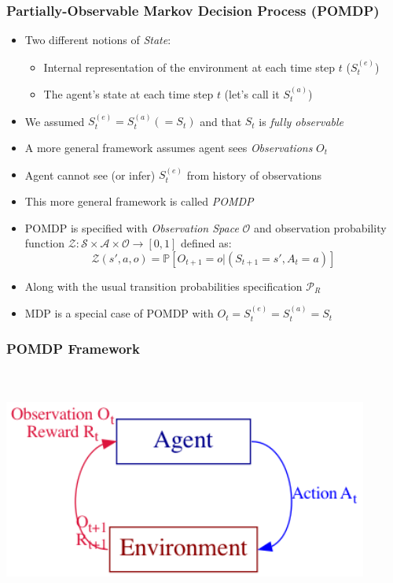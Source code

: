 \documentclass[handout]{beamer}
\begin{document}
\begin{frame}
\frametitle{Partially-Observable Markov Decision Process (POMDP)}
\pause
\begin{itemize}[<+->]
\item Two different notions of {\em State}:
\begin{itemize}
\item Internal representation of the environment at each time step $t$ ($S_t^{(e)}$)
\item The agent's state at each time step $t$ (let's call it $S_t^{(a)}$)
\end{itemize}
\item We assumed $S_t^{(e)} = S_t^{(a)} (= S_t)$ and that $S_t$ is {\em fully observable}
\item A more general framework assumes agent sees {\em Observations} $O_t$
\item Agent cannot see (or infer) $S_t^{(e)}$ from history of observations
\item This more general framework is called {\em POMDP}
\item POMDP is specified with {\em Observation Space} $\mathcal{O}$ and observation probability function 
$\mathcal{Z}: \mathcal{S} \times \mathcal{A} \times \mathcal{O} \rightarrow [0, 1]$
defined as:
$$\mathcal{Z}(s', a, o) = \mathbb{P}[O_{t+1} = o | (S_{t+1} = s', A_t = a)]$$
\item Along with the usual transition probabilities specification $\mathcal{P}_R$
\item MDP is a special case of POMDP with $O_t = S_t^{(e)} = S_t^{(a)} = S_t$
\end{itemize}
\end{frame}

\begin{frame}
\frametitle{POMDP Framework}
\includegraphics[width=12cm, height=8cm]{pomdp.png}
\end{frame}
\end{document}
